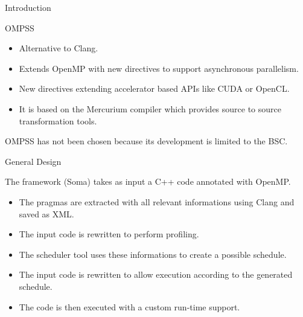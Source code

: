 \documentclass[xcolor=dvipsnames]{beamer}
\begin{document}
\begin{section}{Introduction}
\begin{frame}{\hskip 0.3cm OMPSS}
\begin{itemize}

\item Alternative to Clang.

\item Extends  OpenMP with new directives to support asynchronous parallelism.

\item New directives extending accelerator based APIs like CUDA or OpenCL.

\item It is based on the Mercurium compiler which provides source to source transformation tools.


\end{itemize}

OMPSS has not been chosen because its development is limited to the BSC.

\end{frame}













\begin{frame}{\hskip 0.3cm General Design}

The framework (Soma) takes as input a C++ code annotated with OpenMP.

\begin{itemize}

\item The pragmas are extracted with all relevant informations using Clang and saved as XML.

\item The input code is rewritten to perform profiling.

\item The scheduler tool uses these informations to create a possible schedule.

\item The input code is rewritten to allow execution according to the generated schedule.

\item The code is then executed with a custom run-time support.

\end{itemize}

\end{frame}












\end{section}
\end{document}
